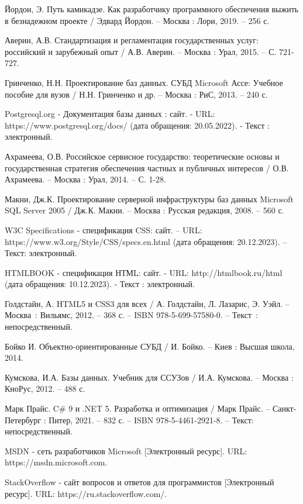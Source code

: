 \begin{thebibliography}{14}

     Йордон, Э. Путь камикадзе. Как разработчику программного обеспечения выжить в безнадежном проекте / Эдвард Йордон. – Москва : Лори, 2019. – 256 с.

     Аверин, А.В. Стандартизация и регламентация государственных услуг: российский и зарубежный опыт / А.В. Аверин. – Москва : Урал, 2015. – С. 721-727.

     Гринченко, Н.Н. Проектирование баз данных. СУБД Microsoft Ассе: Учебное пособие для вузов / Н.Н. Гринченко и др. – Москва : РиС, 2013. – 240 с.

     Postgresql.org -\- Документация базы данных : сайт. - URL: https://www.postgresql.org/docs/ (дата обращения: 20.05.2022). - Текст : электронный.

     Ахрамеева, О.В. Российское сервисное государство: теоретические основы и государственная стратегия обеспечения частных и публичных интересов / О.В. Ахрамеева. – Москва : Урал, 2014. – С. 1-28.

     Макни, Дж.К. Проектирование серверной инфраструктуры баз данных Microsoft SQL Server 2005 / Дж.К. Макни. – Москва : Русская редакция, 2008. – 560 с.

     W3C Specifications -\- спецификация CSS: сайт. – URL: https://www.w3.org/Style/CSS/specs.en.html (дата обращения: 20.12.2023). – Текст: электронный.

     HTMLBOOK -\- спецификация НТМL: сайт. - URL: http://htmlbook.ru/html (дата обращения: 10.12.2023). - Текст : электронный.

 		Голдстайн, А. HTML5 и CSS3 для всех / А. Голдстайн, Л. Лазарис, Э. Уэйл. – Москва~: Вильямс, 2012. – 368 с. – ISBN 978-5-699-57580-0. – Текст~: непосредственный.

     Бойко И. Объектно-ориентированные СУБД / И. Бойко. – Киев : Высшая школа, 2014.

     Кумскова, И.А. Базы данных. Учебник для ССУЗов / И.А. Кумскова. – Москва : КноРус, 2012. – 488 с.

     Марк Прайс. C\# 9 и .NET 5. Разработка и оптимизация / Марк Прайс. – Санкт-Петербург : Питер, 2021. – 832 с. – ISBN 978-5-4461-2921-8. – Текст: непосредственный.

     MSDN -\- сеть разработчиков Microsoft [Электронный ресурс]. URL: https://msdn.microsoft.com.

     StackOverflow -\- сайт вопросов и ответов для программистов [Электронный ресурс]. URL: https://ru.stackoverflow.com/.

\end{thebibliography}
